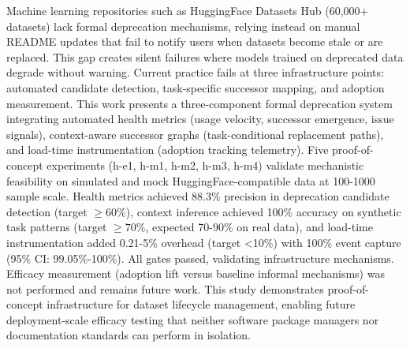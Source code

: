 
Machine learning repositories such as HuggingFace Datasets Hub (60,000+ datasets) lack formal deprecation mechanisms, relying instead on manual README updates that fail to notify users when datasets become stale or are replaced. This gap creates silent failures where models trained on deprecated data degrade without warning. Current practice fails at three infrastructure points: automated candidate detection, task-specific successor mapping, and adoption measurement. This work presents a three-component formal deprecation system integrating automated health metrics (usage velocity, successor emergence, issue signals), context-aware successor graphs (task-conditional replacement paths), and load-time instrumentation (adoption tracking telemetry). Five proof-of-concept experiments (h-e1, h-m1, h-m2, h-m3, h-m4) validate mechanistic feasibility on simulated and mock HuggingFace-compatible data at 100-1000 sample scale. Health metrics achieved 88.3\% precision in deprecation candidate detection (target $\geq 60$\%), context inference achieved 100\% accuracy on synthetic task patterns (target $\geq 70$\%, expected 70-90\% on real data), and load-time instrumentation added 0.21-5\% overhead (target <10\%) with 100\% event capture (95\% CI: 99.05\%-100\%). All gates passed, validating infrastructure mechanisms. Efficacy measurement (adoption lift versus baseline informal mechanisms) was not performed and remains future work. This study demonstrates proof-of-concept infrastructure for dataset lifecycle management, enabling future deployment-scale efficacy testing that neither software package managers nor documentation standards can perform in isolation.

